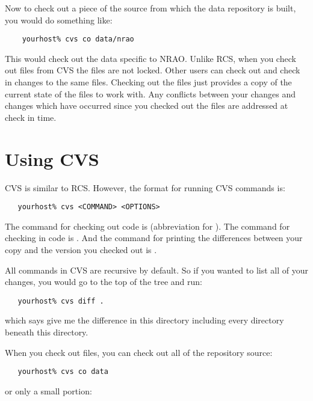 Now to check out a piece of the source from which the data repository is
built, you would do something like:

\begin{verbatim}
    yourhost% cvs co data/nrao
\end{verbatim}

\noindent
This would check out the data specific to NRAO. Unlike RCS, when you check
out files from CVS the files are not locked. Other users can check out and
check in changes to the same files. Checking out the files just provides
a copy of the current state of the files to work with. Any conflicts
between your changes and changes which have occurred since you checked
out the files are addressed at check in time.


\section{Using CVS}
\label{data repository cvs}

CVS is similar to RCS. However, the format for running CVS commands is:

\begin{verbatim}
   yourhost% cvs <COMMAND> <OPTIONS>
\end{verbatim}

\noindent
The command for checking out code is  (abbreviation for ).
The command for checking in code is . And the command for printing
the differences between your copy and the version you checked out is .

All commands in CVS are recursive by default. So if you wanted to list all of your
changes, you would go to the top of the tree and run:

\begin{verbatim}
   yourhost% cvs diff .
\end{verbatim}

\noindent
which says give me the difference in this directory including every directory beneath
this directory.

When you check out files, you can check out all of the repository source:

\begin{verbatim}
   yourhost% cvs co data
\end{verbatim}

\noindent
or only a small portion:

